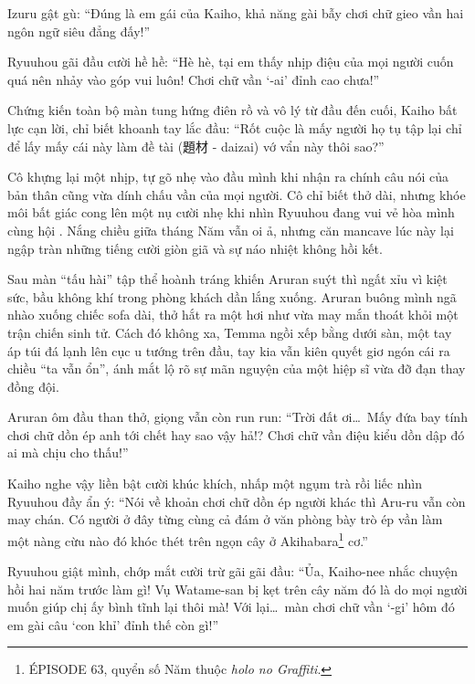 \documentclass[../main.tex]{subfiles}
\begin{document}
Izuru gật gù: ``Đúng là em gái của Kaiho, khả năng gài bẫy chơi chữ gieo vần hai ngôn ngữ siêu đẳng đấy!''

Ryuuhou gãi đầu cười hề hề: ``Hè hè, tại em thấy nhịp điệu của mọi người cuốn quá nên nhảy vào góp vui luôn! Chơi chữ vần `-ai' đỉnh cao chưa!''

Chứng kiến toàn bộ màn tung hứng điên rồ và vô lý từ đầu đến cuối, Kaiho bất lực cạn lời, chỉ biết khoanh tay lắc đầu: ``Rốt cuộc là mấy người họ tụ tập lại chỉ để lấy mấy cái này làm đề tài (題材 - daizai) vớ vẩn này thôi sao?''

Cô khựng lại một nhịp, tự gõ nhẹ vào đầu mình khi nhận ra chính câu nói của bản thân cũng vừa dính chấu vần của mọi người. Cô chỉ biết thở dài, nhưng khóe môi bất giác cong lên một nụ cười nhẹ khi nhìn Ryuuhou đang vui vẻ hòa mình cùng hội \hls. Nắng chiều giữa tháng Năm vẫn oi ả, nhưng căn mancave lúc này lại ngập tràn những tiếng cười giòn giã và sự náo nhiệt không hồi kết.

\omk

Sau màn ``tấu hài'' tập thể hoành tráng khiến Aruran suýt thì ngất xỉu vì kiệt sức, bầu không khí trong phòng khách dần lắng xuống. Aruran buông mình ngã nhào xuống chiếc sofa dài, thở hắt ra một hơi như vừa may mắn thoát khỏi một trận chiến sinh tử. Cách đó không xa, Temma ngồi xếp bằng dưới sàn, một tay áp túi đá lạnh lên cục u tướng trên đầu, tay kia vẫn kiên quyết giơ ngón cái ra chiều ``ta vẫn ổn'', ánh mắt lộ rõ sự mãn nguyện của một hiệp sĩ vừa đỡ đạn thay đồng đội.

Aruran ôm đầu than thở, giọng vẫn còn run run: ``Trời đất ơi\dots\ Mấy đứa bay tính chơi chữ dồn ép anh tới chết hay sao vậy hả!? Chơi chữ vần điệu kiểu dồn dập đó ai mà chịu cho thấu!''

Kaiho nghe vậy liền bật cười khúc khích, nhấp một ngụm trà rồi liếc nhìn Ryuuhou đầy ẩn ý: ``Nói về khoản chơi chữ dồn ép người khác thì Aru-ru vẫn còn may chán. Có người ở đây từng cùng cả đám ở văn phòng bày trò ép vần làm một nàng cừu nào đó khóc thét trên ngọn cây ở Akihabara\footnote{{\flaregothic ÉPISODE 63}, quyển số Năm thuộc \textit{holo no Graffiti}.} cơ.''

Ryuuhou giật mình, chớp mắt cười trừ gãi gãi đầu: ``Ủa, Kaiho-nee nhắc chuyện hồi hai năm trước làm gì! Vụ Watame-san bị kẹt trên cây năm đó là do mọi người muốn giúp chị ấy bình tĩnh lại thôi mà! Với lại\dots\ màn chơi chữ vần `-gi' hôm đó em gài câu `con khỉ' đỉnh thế còn gì!''
\end{document}
